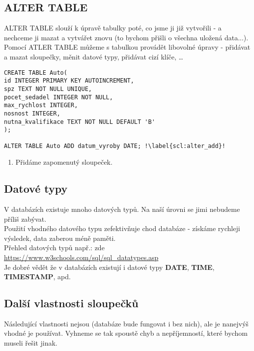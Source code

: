\subsection{ALTER TABLE}
ALTER TABLE slouží k úpravě tabulky poté, co jsme ji již vytvořili - a nechceme ji mazat a vytvářet znovu (to bychom přišli o všechna uložená data...).\\
Pomocí ATLER TABLE můžeme s tabulkou provádět libovolné úpravy - přidávat a mazat sloupečky, měnit datové typy, přidávat cizí klíče, \dots \\

\begin{minipage}[t]{.45\textwidth}
\begin{code}
\begin{verbatim}
CREATE TABLE Auto( 
id INTEGER PRIMARY KEY AUTOINCREMENT, 
spz TEXT NOT NULL UNIQUE,
pocet_sedadel INTEGER NOT NULL,
max_rychlost INTEGER,
nosnost INTEGER,
nutna_kvalifikace TEXT NOT NULL DEFAULT 'B'
);

ALTER TABLE Auto ADD datum_vyroby DATE; !\label{scl:alter_add}!
\end{verbatim}
\label{code:alter_table}
\end{code}
\end{minipage}
\begin{minipage}[t]{.45\textwidth}
\begin{enumerate}
\item[ř. \ref{scl:alter_add}:]	Přidáme zapomenutý sloupeček.
\end{enumerate} 
\end{minipage}


\subsection{Datové typy}
V databázích existuje mnoho datových typů. Na naší úrovni se jimi nebudeme příliš zabývat.\\Použití vhodného datového typu zefektivňuje chod databáze - získáme rychleji výsledek, data zaberou méně paměti.\\Přehled datových typů např.: zde \url{https://www.w3schools.com/sql/sql_datatypes.asp}\\
Je dobré vědět že v databázích existují i datové typy \textbf{DATE}, \textbf{TIME}, \textbf{TIMESTAMP}, apd.

\subsection{Další vlastnosti sloupečků}
Následující vlastnosti nejsou  (databáze bude fungovat i bez nich), ale je nanejvýš vhodné je používat. Vyhneme se tak spoustě chyb a nepříjemností, které bychom museli řešit jinak.

